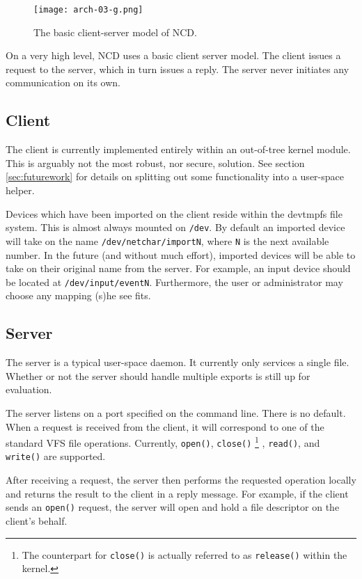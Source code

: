 \documentclass[11pt,twocolumn]{article}
\begin{document}
\begin{figure}[h]
  \centering
  \texttt{[image: arch-03-g.png]}
  \caption{The basic client-server model of NCD.}
  \label{fig:architecture}
\end{figure}

On a very high level, NCD uses a basic client server model. The client
issues a request to the server, which in turn issues a reply. The
server never initiates any communication on its own.

\subsection{Client}

The client is currently implemented entirely within an out-of-tree kernel
module. This is arguably not the most robust, nor secure, solution. See
section \ref{sec:futurework} for details on splitting out some functionality
into a user-space helper.

Devices which have been imported on the client reside within the
devtmpfs file system. This is almost always mounted on \texttt{/dev}. By
default an imported device will take on the name
\texttt{/dev/netchar/importN}, where \texttt{N} is the next available
number. In the future (and without much effort), imported devices will
be able to take on their original name from the server. For example, an
input device should be located at \texttt{/dev/input/eventN}. Furthermore,
the user or administrator may choose any mapping (s)he see fits.

\subsection{Server}

The server is a typical user-space daemon. It
currently only services a single file. Whether or not the server should
handle multiple exports is still up for evaluation.

The server listens on a port specified on the command line. There is no
default. When a request is received from the client, it will correspond
to one of the standard VFS file operations. Currently, \texttt{open()},
\texttt{close()}
\footnote{The counterpart for \texttt{close()} is actually referred to
as \texttt{release()} within the kernel.}
, \texttt{read()}, and \texttt{write()} are supported.

After receiving a request, the server then performs the requested
operation locally and returns the result to the client in a reply
message. For example, if the client sends an \texttt{open()} request,
the server will open and hold a file descriptor on the client's behalf.
\end{document}
